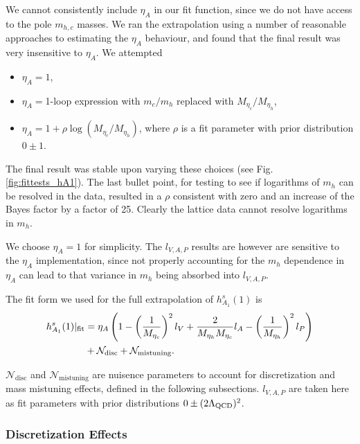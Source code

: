 We cannot consistently include $\eta_A$ in our fit function, since we do not have access to the pole $m_{h,c}$ masses. We ran the extrapolation using a number of reasonable approaches to estimating the $\eta_A$ behaviour, and found that the final result was very insensitive to $\eta_A$. We attempted
\begin{itemize}
\item
  $\eta_A=1$,
\item
  $\eta_A = $1-loop expression with $m_c/m_h$ replaced with $M_{\eta_c}/M_{\eta_h}$,
\item
  $\eta_A = 1 + \rho \log(M_{\eta_c}/M_{\eta_h})$, where $\rho$ is a fit parameter with prior distribution $0\pm 1$.
\end{itemize}

The final result was stable upon varying these choices (see Fig. \ref{fig:fittests_hA1}). The last bullet point, for testing to see if logarithms of $m_h$ can be resolved in the data, resulted in a $\rho$ consistent with zero and an increase of the Bayes factor by a factor of 25. Clearly the lattice data cannot resolve logarithms in $m_h$.

We choose $\eta_A=1$ for simplicity. The $l_{V,A,P}$ results are however are sensitive to the $\eta_A$ implementation, since not properly accounting for the $m_h$ dependence in $\eta_A$ can lead to that variance in $m_h$ being absorbed into $l_{V,A,P}$.

The fit form we used for the full extrapolation of $h_{A_1}^s(1)$ is
\begin{align}
  h^s_{A_1}(1)|_{\text{fit}} &= \eta_A \left( 1 - \left({1\over M_{\eta_c}}\right)^2 l_V + {2\over M_{\eta_h}M_{\eta_c}} l_A- \left({1\over M_{\eta_h}}\right)^2 l_P \right) \nonumber \\ &+ \mathcal{N}_{\text{disc}} + \mathcal{N}_{\text{mistuning}}.
  \label{eq:fitform}
\end{align}

$\mathcal{N}_{\text{disc}}$ and $\mathcal{N}_{\text{mistuning}}$ are nuisence parameters to account for discretization and mass mistuning effects, defined in the following subsections. $l_{V,A,P}$ are taken here as fit parameters with prior distributions $0\pm (2\Lambda_{\text{QCD}})^2$.

\subsubsection{Discretization Effects}

